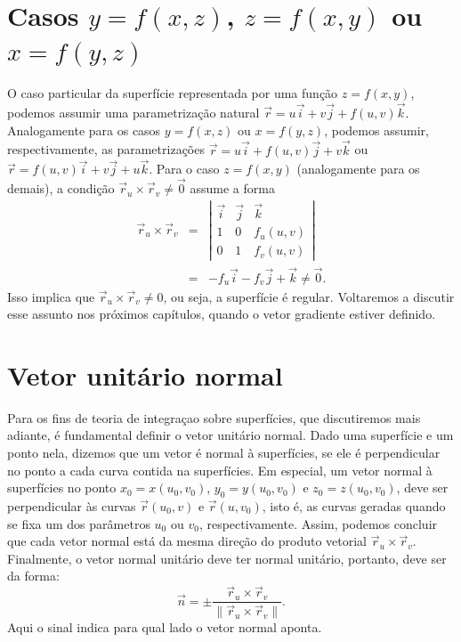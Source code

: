 \section{Casos $y=f(x,z)$, $z=f(x,y)$ ou $x=f(y,z)$}
O caso particular da superfície representada por uma função $z=f(x,y)$, podemos assumir uma parametrização natural $\vec{r}=u\vec{i}+v\vec{j}+f(u,v)\vec{k}$. Analogamente para os casos $y=f(x,z)$ ou $x=f(y,z)$, podemos assumir, respectivamente, as parametrizações $\vec{r}=u\vec{i}+f(u,v)\vec{j}+v\vec{k}$ ou $\vec{r}=f(u,v)\vec{i}+v\vec{j}+u\vec{k}$. Para o caso $z=f(x,y)$ (analogamente para os demais), a condição $\vec{r}_u\times \vec{r}_v\neq \vec{0}$ assume a forma
\begin{eqnarray*}
 \vec{r}_u\times \vec{r}_v&=&\left|\begin{array}{ccc}\vec{i}&\vec{j}&\vec{k}\\ 1&0&f_u(u,v)\\0&1&f_v(u,v)\end{array} \right|\\&=&-f_u\vec{i}-f_v\vec{j}+\vec{k}\neq \vec{0}.
\end{eqnarray*}
Isso implica que $ \vec{r}_u\times \vec{r}_v \neq 0$, ou seja, a superfície \'{e} regular. Voltaremos a discutir esse assunto nos próximos capítulos, quando o vetor gradiente estiver definido.
\section{Vetor unitário normal}
Para os fins de teoria de integraçao sobre superfícies, que discutiremos mais adiante, é fundamental definir o vetor unitário normal. Dado uma superfície e um ponto nela, dizemos que um vetor é normal à superfícies, se ele é perpendicular no ponto a cada curva contida na superfícies. Em especial, um vetor normal à superfícies no ponto $x_0=x(u_0,v_0)$, $y_0=y(u_0,v_0)$ e $z_0=z(u_0,v_0)$, deve ser perpendicular às curvas $\vec{r}(u_0,v)$ e $\vec{r}(u,v_0)$, isto é, as curvas geradas quando se fixa um dos parâmetros $u_0$ ou $v_0$, respectivamente. Assim, podemos concluir que cada vetor normal está da mesma direção do produto vetorial $\vec{r}_u\times\vec{r}_v$. Finalmente, o vetor normal unitário deve ter normal unitário, portanto, deve ser da forma:
\begin{equation}
 \vec{n} = \pm \frac{\vec{r}_u\times\vec{r}_v}{\|\vec{r}_u\times\vec{r}_v\|}.
\end{equation}
Aqui o sinal indica para qual lado o vetor normal aponta.
